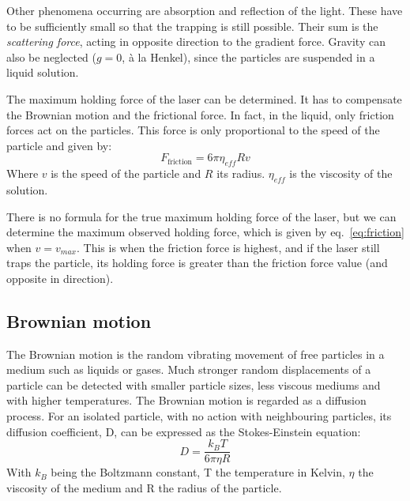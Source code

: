 \documentclass{article}
\begin{document}
Other phenomena occurring are absorption and reflection of the light. These have to be sufficiently small so that the trapping is still possible. Their sum is the \textit{scattering force}, acting in opposite direction to the gradient force. Gravity can also be neglected ($g=0$, à la Henkel), since the particles are suspended in a liquid solution. \medskip

The maximum holding force of the laser can be determined. It has to compensate the Brownian motion and the frictional force. In fact, in the liquid, only friction forces act on the particles. This force is only proportional to the speed of the particle and given by:
\begin{equation}
    F_{\text{friction}} = 6 \pi \eta_{eff} R v
    \label{eq:friction}
\end{equation}
Where $v$ is the speed of the particle and $R$ its radius. $\eta_{eff}$ is the viscosity of the solution. 

There is no formula for the true maximum holding force of the laser, but we can determine the maximum observed holding force, which is given by eq.~\ref{eq:friction} when $v=v_{max}$. This is when the friction force is highest, and if the laser still traps the particle, its holding force is greater than the friction force value (and opposite in direction).

\subsection{Brownian motion}
The Brownian motion is the random vibrating movement of free particles in a medium such as liquids or gases. Much stronger random displacements of a particle can be detected with smaller particle sizes, less viscous mediums and with higher temperatures. The Brownian motion is regarded as a diffusion process. For an isolated particle, with no action with neighbouring particles, its diffusion coefficient, D, can be expressed as the Stokes-Einstein equation:
\begin{equation}
    D = \frac{k_BT}{6\pi\eta R}
\end{equation}
With $k_B$ being the Boltzmann constant, T the temperature in Kelvin, $\eta$ the viscosity of the medium and R the radius of the particle.
\end{document}
